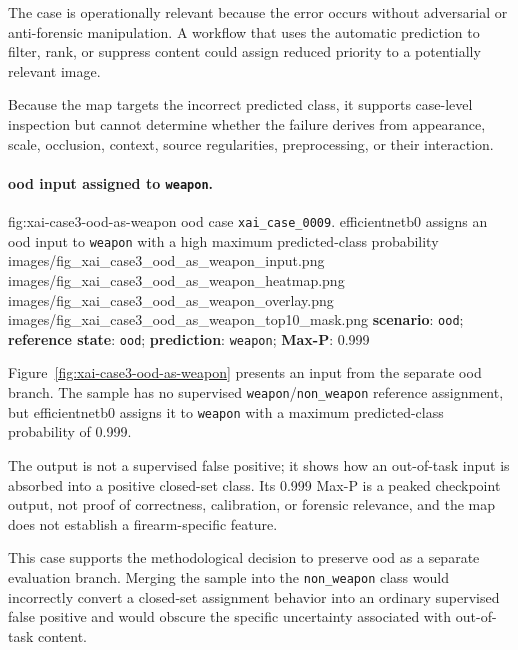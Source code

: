 The case is operationally relevant because the error occurs without adversarial
or anti-forensic manipulation. A workflow that uses the automatic prediction
to filter, rank, or suppress content could assign reduced priority to a
potentially relevant image.

Because the map targets the incorrect predicted class, it supports case-level
inspection but cannot determine whether the failure derives from appearance,
scale, occlusion, context, source regularities, preprocessing, or their
interaction.

\paragraph{\texorpdfstring{\gls{ood}}{Out-of-Distribution} input assigned to
\texttt{weapon}.}

\XAIcaseFigureMaskGrid
{fig:xai-case3-ood-as-weapon}
{\gls{ood} case \texttt{xai\_case\_0009}. \gls{efficientnetb0} assigns an
\gls{ood} input to \texttt{weapon} with a high maximum predicted-class
probability}
{images/fig_xai_case3_ood_as_weapon_input.png}
{images/fig_xai_case3_ood_as_weapon_heatmap.png}
{images/fig_xai_case3_ood_as_weapon_overlay.png}
{images/fig_xai_case3_ood_as_weapon_top10_mask.png}
{\textbf{scenario}: \texttt{ood};
\textbf{reference state}: \texttt{ood};
\textbf{prediction}: \texttt{weapon};
\textbf{Max-P}: 0.999}

Figure~\ref{fig:xai-case3-ood-as-weapon} presents an input from the separate
\gls{ood} branch. The sample has no supervised
\texttt{weapon}/\texttt{non\_weapon} reference assignment, but
\gls{efficientnetb0} assigns it to \texttt{weapon} with a maximum predicted-class probability
of 0.999.

The output is not a supervised false positive; it shows how an out-of-task
input is absorbed into a positive closed-set class. Its 0.999 Max-P is a peaked
checkpoint output, not proof of correctness, calibration, or forensic
relevance, and the map does not establish a firearm-specific feature.

This case supports the methodological decision to preserve \gls{ood} as a
separate evaluation branch. Merging the sample into the
\texttt{non\_weapon} class would incorrectly convert a closed-set assignment
behavior into an ordinary supervised false positive and would obscure the
specific uncertainty associated with out-of-task content.

